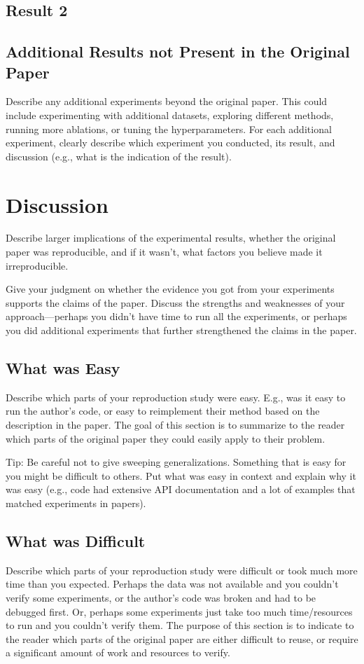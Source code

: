 \documentclass{article}
\begin{document}
\subsection{Result 2}

\subsection{Additional Results not Present in the Original Paper}

Describe any additional experiments beyond the original paper. This could include experimenting with additional datasets, exploring different methods, running more ablations, or tuning the hyperparameters. For each additional experiment, clearly describe which experiment you conducted, its result, and discussion (e.g., what is the indication of the result).

\section{Discussion}

Describe larger implications of the experimental results, whether the original paper was reproducible, and if it wasn’t, what factors you believe made it irreproducible. 

Give your judgment on whether  the evidence you got from your experiments supports the claims of the paper. Discuss the strengths and weaknesses of your approach---perhaps you didn't have time to run all the experiments, or perhaps you did additional experiments that further strengthened the claims in the paper.

\subsection{What was Easy}
Describe which parts of your reproduction study were easy. E.g., was it easy to run the author's code, or easy to reimplement their method based on the description in the paper. The goal of this section is to summarize to the reader which parts of the original paper they could easily apply to their problem. 

Tip: Be careful not to give sweeping generalizations. Something that is easy for you might be difficult to others. Put what was easy in context and explain why it was easy (e.g., code had extensive API documentation and a lot of examples that matched experiments in papers). 

\subsection{What was Difficult}
Describe which parts of your reproduction study were difficult or took much more time than you expected. Perhaps the data was not available and you couldn't verify some experiments, or the author's code was broken and had to be debugged first. Or, perhaps some experiments just take too much time/resources to run and you couldn't verify them. The purpose of this section is to indicate to the reader which parts of the original paper are either difficult to reuse, or require a significant amount of work and resources to verify. 
\end{document}
